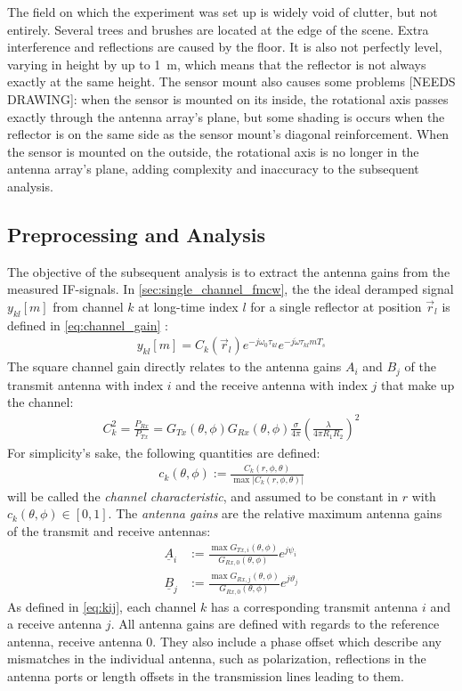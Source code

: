 The field on which the experiment was set up is widely void of clutter, but not entirely.
Several trees and brushes are located at the edge of the scene.
Extra interference and reflections are caused by the floor.
It is also not perfectly level, varying in height by up to \SI{1}{\meter},
which means that the reflector is not always exactly at the same height.
The sensor mount also causes some problems [NEEDS DRAWING]:
when the sensor is mounted on its inside,
the rotational axis passes exactly through the antenna array's plane,
but some shading is occurs when the reflector is on the same side as the sensor mount's diagonal reinforcement.
When the sensor is mounted on the outside,
the rotational axis is no longer in the antenna array's plane,
adding complexity and inaccuracy to the subsequent analysis.

\subsection{Preprocessing and Analysis}
The objective of the subsequent analysis is to extract the antenna gains from the measured IF-signals.
In \cref{sec:single_channel_fmcw},
the the ideal deramped signal $y_{kl}[m]$ from channel $k$ at long-time index $l$
for a single reflector at position $\vec r_l$
is defined in \cref{eq:channel_gain} :
\begin{align*}
  y_{kl}[m] =  C_k(\vec r_l)e^{-j\omega_0\tau_{kl}}e^{-j\dot\omega\tau_{kl}mT_s}
\end{align*}
The square channel gain directly relates to the antenna gains $A_i$ and $B_j$
of the transmit antenna with index $i$ and the receive antenna with index $j$ that make up the channel:
\begin{align*}
  C_k^2 = \frac{P_{Rx}}{P_{Tx}}
  = G_{Tx}(\theta,\phi)  G_{Rx}(\theta,\phi) \frac{\sigma}{4\pi} \left(\frac{\lambda}{4\pi R_1 R_2}\right)^2
\end{align*}
For simplicity's sake, the following quantities are defined:
\begin{align}
  c_k(\theta,\phi) := \frac{C_k(r,\phi,\theta)}{\max |C_k(r,\phi,\theta)|}
\end{align}
will be called the \emph{channel characteristic}, and assumed to be constant in $r$ with $c_k(\theta,\phi) \in [0,1]$.
The \emph{antenna gains} are the relative maximum antenna gains of the transmit and receive antennas:
\begin{align}
  \underline A_i & :=  \frac{\max G_{Tx,i}(\theta,\phi)}{ G_{Rx,0}(\theta,\phi)}e^{j\psi_i}      \\
  \underline B_j & :=  \frac{\max G_{Rx,j}(\theta,\phi)}{ G_{Rx,0}(\theta,\phi)}e^{j\vartheta_j}
\end{align}
As defined in \cref{eq:kij}, each channel $k$ has a corresponding transmit antenna $i$ and a receive antenna $j$.
All antenna gains are defined with regards to the reference antenna, receive antenna 0.
They also include a phase offset which describe any mismatches in the individual antenna,
such as polarization, reflections in the antenna ports or length offsets in the transmission lines leading to them.

